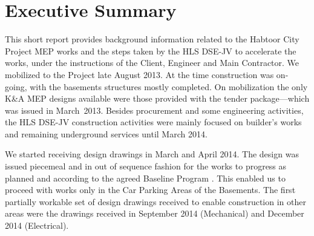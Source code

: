 %
\def\thesubsubsection{}         
\def\JV{HLS DSE-JV\xspace}
\def\letter#1{\texttt{HLSDSEJV/HC/L/YL/#1}\xspace}
\def\KA{K\&A}
\def\DT#1{HLG Transmittal Ref. No.: \texttt{HLG-626-DT-HLS-#1}\xspace}
\def\idxbusbar#1{\index{Busbar Delays>#1}}
\def\idxwestin#1{\index{Westin Delays>#1}}
\def\idxstregis#1{\index{St. Regis Delays>#1}}
\def\idxahu#1{\index{Air Handling Unit Delays>#1}}
\let\idxahus\idxahu
\def\CAR#1{\index{Cost Adjustment Requests>CAR-#1}{\texttt{CAR-#1}}\xspace}
\def\idxbasement#1{\index{Basement delays>#1}}
\let\basement\idxbasement
\def\idxdewa#1{\index{Dewa Approvals>#1}}


\mainmatter
\pagestyle{plain}
\chapter{Executive Summary}
\thispagestyle{empty}

This short report provides background information related to  the Habtoor City Project MEP works and the steps taken by the \JV to accelerate the works, under the instructions of the Client, Engineer and Main Contractor.  We mobilized to the Project late August 2013. At the time construction was on-going, with the basements structures mostly completed. On mobilization the only K\&A MEP designs available were those provided with the tender package---which was issued in March~2013. Besides procurement and some engineering activities, the \JV  construction activities were mainly focused on builder's works and remaining underground services until March 2014. 

We started receiving design drawings in March and April 2014. The design was issued piecemeal and in out of sequence fashion for the works to progress as planned and according to the agreed Baseline Program . This enabled us to proceed with works only in the Car Parking Areas of the Basements.  The first partially workable set of design drawings received to enable construction in other areas were the drawings received in September 2014 (Mechanical) and December 2014 (Electrical).


